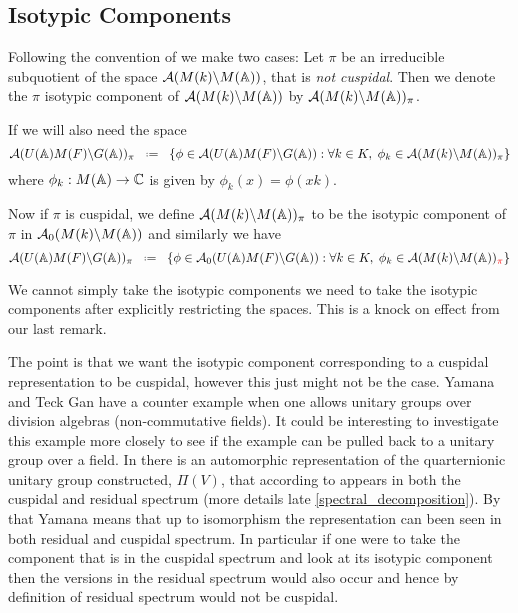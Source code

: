 \subsection{Isotypic Components}
Following the convention of \cite[II.1]{moeglinSpectralDecompositionEisenstein1995} we make two cases:
Let \(\pi\) be an irreducible subquotient of the space \(\mathcal{A}(M(k) \backslash M(\A))\), that is \textit{not cuspidal}. Then we denote the \(\pi\) isotypic component of \(\mathcal{A}(M(k) \backslash M(\A))\) by \(\mathcal{A}(M(k) \backslash M(\A))_\pi\).

If we will also need the space 
\[\mathcal{A}(U(\A)M(F) \backslash G(\A))_\pi \defeq \{\phi \in \mathcal{A}(U(\A)M(F) \backslash G(\A)) : \forall k\in K, \; \phi_k\in\mathcal{A}(M(k) \backslash M(\A))_\pi \}\]
where \(\phi_k: M(\A) \to \C\) is given by \(\phi_k(x) = \phi(xk)\).

Now if \(\pi\) is cuspidal, we define \(\mathcal{A}(M(k) \backslash M(\A))_\pi\) to be the isotypic component of \(\pi\) in \(\mathcal{A}_0(M(k) \backslash M(\A))\) and similarly we have 
\[\mathcal{A}(U(\A)M(F) \backslash G(\A))_\pi \defeq \{\phi \in \mathcal{A}_0(U(\A)M(F) \backslash G(\A)) : \forall k\in K, \; \phi_k\in\mathcal{A}(M(k) \backslash M(\A))_{\textcolor{red}{\pi}} \}\]
\begin{Remark}
    We cannot simply take the isotypic components we need to take the isotypic components after explicitly restricting the spaces. This is a knock on effect from our last remark.
\end{Remark}

The point is that we want the isotypic component corresponding to a cuspidal representation to be cuspidal, however this just might not be the case. 
Yamana and Teck Gan have a counter example when one allows unitary groups over division algebras (non-commutative fields). It could be interesting to investigate this example more closely to see if the example can be pulled back to a unitary group over a field. In \cite{yamanaSiegelWeilFormulaQuaternionic2013} there is an automorphic representation of the quarternionic unitary group constructed, \(\Pi(V)\), that according to \cite[Rm. 7.12]{yamanaSiegelWeilFormulaQuaternionic2013} appears in both the cuspidal and residual spectrum (more details late \ref{spectral_decomposition}). By that Yamana means that up to isomorphism the representation can been seen in both residual and cuspidal spectrum. In particular if one were to take the component that is in the cuspidal spectrum and look at its isotypic component then the versions in the residual spectrum would also occur and hence by definition of residual spectrum would not be cuspidal.

